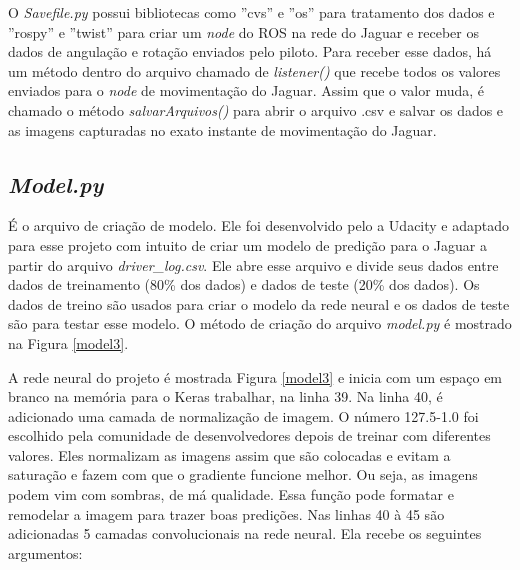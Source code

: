 O \textit{Savefile.py} possui bibliotecas como ''cvs'' e ''os'' para tratamento dos dados e ''rospy'' e ''twist'' para criar um \textit{node} do ROS na rede do Jaguar e receber os dados de angulação e rotação enviados pelo piloto. Para receber esse dados, há um método dentro do arquivo chamado de \textit{listener()} que recebe todos os valores enviados para o \textit{node} de movimentação do Jaguar. Assim que o valor muda, é chamado o método \textit{salvarArquivos()} para abrir o arquivo .csv e salvar os dados e as imagens capturadas no exato instante de movimentação do Jaguar.

\subsection{\textit{Model.py}}
\label{sec:model.py}

É o arquivo de criação de modelo. 
Ele foi desenvolvido pelo a Udacity e adaptado para esse projeto com intuito de criar um modelo de predição para o Jaguar a partir do arquivo \textit{driver\_log.csv}. Ele abre esse arquivo e divide seus dados entre dados de treinamento (80\% dos dados) e dados de teste (20\% dos dados). Os dados de treino são usados para criar o modelo da rede neural e os dados de teste são para testar esse modelo. O método de criação do arquivo \textit{model.py} é mostrado na Figura \ref{model3}.

	\begin{figure}[H]
		\centering
\end{figure}

A rede neural do projeto é mostrada Figura \ref{model3} e inicia com um espaço em branco na memória para o Keras trabalhar, na linha 39. 
Na linha 40, é adicionado uma camada de normalização de imagem. O número 127.5-1.0 foi escolhido pela comunidade de desenvolvedores depois de treinar com diferentes valores. Eles normalizam as imagens assim que são colocadas e evitam a saturação e fazem com que o gradiente funcione melhor. Ou seja, as imagens podem vim com sombras, de má qualidade. Essa função pode formatar e remodelar a imagem para trazer boas predições.
Nas linhas 40 à 45 são adicionadas 5 camadas convolucionais na rede neural. Ela recebe os seguintes argumentos: 


